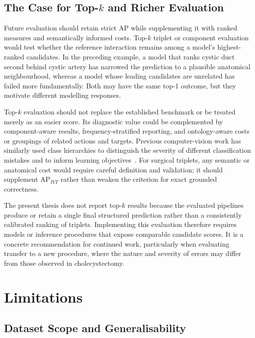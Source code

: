 \subsection{The Case for \texorpdfstring{Top-$k$}{Top-k} and Richer Evaluation}
\label{sec:discussion-topk}

Future evaluation should retain strict AP while supplementing it with ranked measures and semantically informed costs. Top-$k$ triplet or component evaluation would test whether the reference interaction remains among a model's highest-ranked candidates. In the preceding example, a model that ranks cystic duct second behind cystic artery has narrowed the prediction to a plausible anatomical neighbourhood, whereas a model whose leading candidates are unrelated has failed more fundamentally. Both may have the same top-1 outcome, but they motivate different modelling responses.

Top-$k$ evaluation should not replace the established benchmark or be treated merely as an easier score. Its diagnostic value could be complemented by component-aware results, frequency-stratified reporting, and ontology-aware costs or groupings of related actions and targets. Previous computer-vision work has similarly used class hierarchies to distinguish the severity of different classification mistakes and to inform learning objectives~\cite{bertinetto2020making}. For surgical triplets, any semantic or anatomical cost would require careful definition and validation; it should supplement AP$_{IVT}$ rather than weaken the criterion for exact grounded correctness.

The present thesis does not report top-$k$ results because the evaluated pipelines produce or retain a single final structured prediction rather than a consistently calibrated ranking of triplets. Implementing this evaluation therefore requires models or inference procedures that expose comparable candidate scores. It is a concrete recommendation for continued work, particularly when evaluating transfer to a new procedure, where the nature and severity of errors may differ from those observed in cholecystectomy.

\section{Limitations}
\label{sec:discussion-limitations}

\subsection{Dataset Scope and Generalisability}
\label{sec:discussion-dataset-limitations}

